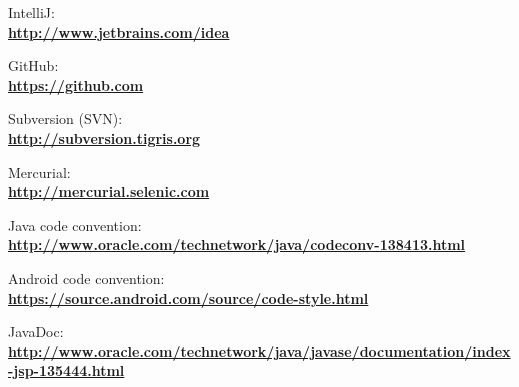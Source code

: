 \begin{thebibliography}{1}
 IntelliJ:\\
\textbf{ \url{http://www.jetbrains.com/idea}}

 GitHub:\\
\textbf{ \url{https://github.com}}

 Subversion (SVN):\\
\textbf{ \url{http://subversion.tigris.org}}

 Mercurial:\\
\textbf{ \url{http://mercurial.selenic.com}}

 Java code convention:\\
\textbf{ \url{http://www.oracle.com/technetwork/java/codeconv-138413.html}}

 Android code convention:\\
\textbf{ \url{https://source.android.com/source/code-style.html}}

 JavaDoc:\\
\textbf{ \url{http://www.oracle.com/technetwork/java/javase/documentation/index-jsp-135444.html}}

\end{thebibliography}
